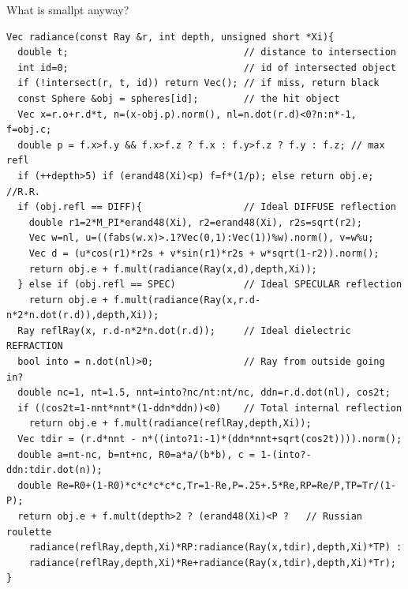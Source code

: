 \documentclass[8pt]{beamer}
\begin{document}
\begin{frame}[fragile]{What is smallpt anyway?}
\footnotesize
\begin{verbatim}
Vec radiance(const Ray &r, int depth, unsigned short *Xi){ 
  double t;                               // distance to intersection 
  int id=0;                               // id of intersected object 
  if (!intersect(r, t, id)) return Vec(); // if miss, return black 
  const Sphere &obj = spheres[id];        // the hit object 
  Vec x=r.o+r.d*t, n=(x-obj.p).norm(), nl=n.dot(r.d)<0?n:n*-1, f=obj.c; 
  double p = f.x>f.y && f.x>f.z ? f.x : f.y>f.z ? f.y : f.z; // max refl 
  if (++depth>5) if (erand48(Xi)<p) f=f*(1/p); else return obj.e; //R.R. 
  if (obj.refl == DIFF){                  // Ideal DIFFUSE reflection 
    double r1=2*M_PI*erand48(Xi), r2=erand48(Xi), r2s=sqrt(r2); 
    Vec w=nl, u=((fabs(w.x)>.1?Vec(0,1):Vec(1))%w).norm(), v=w%u; 
    Vec d = (u*cos(r1)*r2s + v*sin(r1)*r2s + w*sqrt(1-r2)).norm(); 
    return obj.e + f.mult(radiance(Ray(x,d),depth,Xi)); 
  } else if (obj.refl == SPEC)            // Ideal SPECULAR reflection 
    return obj.e + f.mult(radiance(Ray(x,r.d-n*2*n.dot(r.d)),depth,Xi)); 
  Ray reflRay(x, r.d-n*2*n.dot(r.d));     // Ideal dielectric REFRACTION 
  bool into = n.dot(nl)>0;                // Ray from outside going in? 
  double nc=1, nt=1.5, nnt=into?nc/nt:nt/nc, ddn=r.d.dot(nl), cos2t; 
  if ((cos2t=1-nnt*nnt*(1-ddn*ddn))<0)    // Total internal reflection 
    return obj.e + f.mult(radiance(reflRay,depth,Xi)); 
  Vec tdir = (r.d*nnt - n*((into?1:-1)*(ddn*nnt+sqrt(cos2t)))).norm(); 
  double a=nt-nc, b=nt+nc, R0=a*a/(b*b), c = 1-(into?-ddn:tdir.dot(n)); 
  double Re=R0+(1-R0)*c*c*c*c*c,Tr=1-Re,P=.25+.5*Re,RP=Re/P,TP=Tr/(1-P); 
  return obj.e + f.mult(depth>2 ? (erand48(Xi)<P ?   // Russian roulette 
    radiance(reflRay,depth,Xi)*RP:radiance(Ray(x,tdir),depth,Xi)*TP) : 
    radiance(reflRay,depth,Xi)*Re+radiance(Ray(x,tdir),depth,Xi)*Tr); 
} 
\end{verbatim}
\end{frame}

\end{document}

